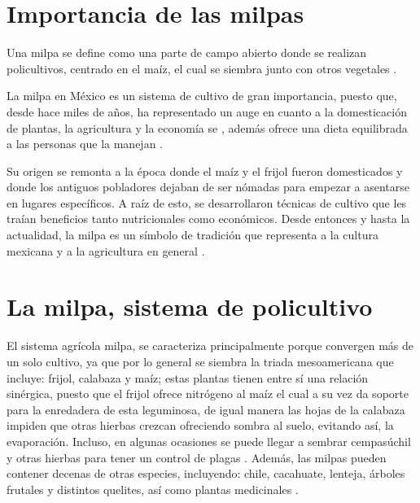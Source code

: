 \documentclass[12pt,letterpaper,oneside]{report}
\begin{document}
\section{Importancia de las milpas}
Una milpa se define como una parte de campo abierto donde se realizan policultivos, centrado en el maíz, el cual se siembra junto con otros vegetales \autocite{Nigh2013}.
\par
La milpa en México es un sistema de cultivo de gran importancia, puesto que, desde hace miles de años, ha representado un auge en cuanto a la domesticación de plantas, la agricultura y la economía se \autocite{Zizumbo-Villarreal2017}, además ofrece una dieta equilibrada a las personas que la manejan \autocite{Gutierrez-Serrano2009}.
\par
Su origen se remonta a la época donde el maíz y el frijol fueron domesticados y donde los antiguos pobladores dejaban de ser nómadas para empezar a asentarse en lugares específicos. A raíz de esto, se desarrollaron técnicas de cultivo que les traían beneficios tanto nutricionales como económicos. Desde entonces y hasta la actualidad, la milpa es un símbolo de tradición que representa a la cultura mexicana y a la agricultura en general \autocite{Escalante-Gonzalbo2008}.
\section{La milpa, sistema de policultivo}
El sistema agrícola milpa, se caracteriza principalmente porque convergen más de un solo cultivo, ya que por lo general se siembra la triada mesoamericana que incluye: frijol, calabaza y maíz; estas plantas tienen entre sí una relación sinérgica, puesto que el frijol ofrece nitrógeno al maíz el cual a su vez da soporte para la enredadera de esta leguminosa, de igual manera las hojas de la calabaza impiden que otras hierbas crezcan ofreciendo sombra al suelo, evitando así, la evaporación. Incluso, en algunas ocasiones se puede llegar a sembrar cempasúchil y otras hierbas para tener un control de plagas \autocite{Buenrostro2009}. Además, las milpas pueden contener decenas de otras especies, incluyendo: chile, cacahuate, lenteja, árboles frutales y distintos quelites, así como plantas medicinales \autocite{Teran1995}.
\end{document}
